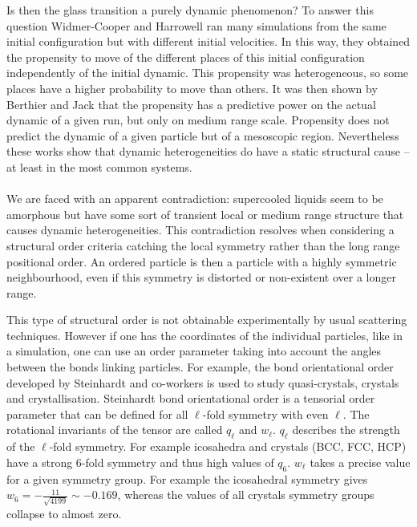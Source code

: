 Is then the glass transition a purely dynamic phenomenon? To answer this question Widmer-Cooper and Harrowell ran many simulations from the same initial configuration but with different initial velocities. In this way, they obtained the propensity to move of the different places of this initial configuration independently of the initial dynamic. This propensity was heterogeneous, so some places have a higher probability to move than others. It was then shown by Berthier and Jack that the propensity has a predictive power on the actual dynamic of a given run, but only on medium range scale. Propensity does not predict the dynamic of a given particle but of a mesoscopic region. Nevertheless these works show that dynamic heterogeneities do have a static structural cause – at least in the most common systems.

\paragraph{}

We are faced with an apparent contradiction: supercooled liquids seem to be amorphous but have some sort of transient local or medium range structure that causes dynamic heterogeneities. This contradiction resolves when considering a structural order criteria catching the local symmetry rather than the long range positional order. An ordered particle is then a particle with a highly symmetric neighbourhood, even if this symmetry is distorted or non-existent over a longer range.

This type of structural order is not obtainable experimentally by usual scattering techniques. However if one has the coordinates of the individual particles, like in a simulation, one can use an order parameter taking into account the angles between the bonds linking particles. For example, the bond orientational order developed by Steinhardt and co-workers is used to study quasi-crystals, crystals and crystallisation. Steinhardt bond orientational order is a tensorial order parameter that can be defined for all $\ell$-fold symmetry with even $\ell$. The rotational invariants of the tensor are called $q_\ell$ and $w_\ell$. $q_\ell$ describes the strength of the $\ell$-fold symmetry. For example icosahedra and crystals (BCC, FCC, HCP) have a strong 6-fold symmetry and thus high values of $q_6$. $w_\ell$ takes a precise value for a given symmetry group. For example the icosahedral symmetry gives $w_6= -\frac{11}{\sqrt{4199}} \sim -0.169$, whereas the values of all crystals symmetry groups collapse to almost zero.

